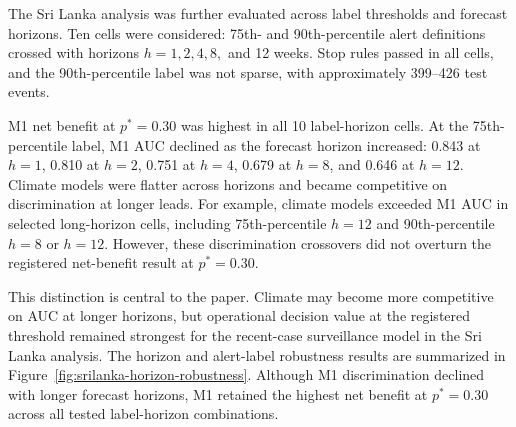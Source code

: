 \documentclass[11pt,a4paper]{article}
\begin{document}
The Sri Lanka analysis was further evaluated across label thresholds and forecast horizons. Ten cells were considered: 75th- and 90th-percentile alert definitions crossed with horizons $h=1,2,4,8,$ and 12 weeks. Stop rules passed in all cells, and the 90th-percentile label was not sparse, with approximately 399--426 test events.

M1 net benefit at $p^*=0.30$ was highest in all 10 label-horizon cells. At the 75th-percentile label, M1 AUC declined as the forecast horizon increased: 0.843 at $h=1$, 0.810 at $h=2$, 0.751 at $h=4$, 0.679 at $h=8$, and 0.646 at $h=12$. Climate models were flatter across horizons and became competitive on discrimination at longer leads. For example, climate models exceeded M1 AUC in selected long-horizon cells, including 75th-percentile $h=12$ and 90th-percentile $h=8$ or $h=12$. However, these discrimination crossovers did not overturn the registered net-benefit result at $p^*=0.30$.

This distinction is central to the paper. Climate may become more competitive on AUC at longer horizons, but operational decision value at the registered threshold remained strongest for the recent-case surveillance model in the Sri Lanka analysis.
The horizon and alert-label robustness results are summarized in Figure~\ref{fig:srilanka-horizon-robustness}.
Although M1 discrimination declined with longer forecast horizons, M1 retained the highest net benefit at $p^*=0.30$ across all tested label-horizon combinations.
\end{document}
